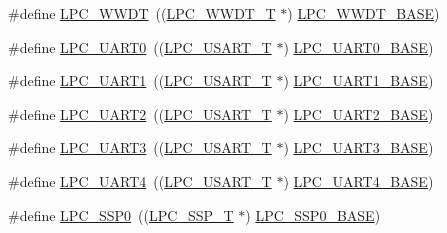 \begin{DoxyCompactItemize}
\item 
\#define \hyperlink{group__PERIPH__407X__8X__BASE_ga235e068b1412366044449dba68194c55}{L\-P\-C\-\_\-\-W\-W\-D\-T}~((\hyperlink{structLPC__WWDT__T}{L\-P\-C\-\_\-\-W\-W\-D\-T\-\_\-\-T}             $\ast$) \hyperlink{group__PERIPH__407X__8X__BASE_ga9b83c39ba53f9c9e87974984c96e35de}{L\-P\-C\-\_\-\-W\-W\-D\-T\-\_\-\-B\-A\-S\-E})
\item 
\#define \hyperlink{group__PERIPH__407X__8X__BASE_ga6ba29f0f9b8af2f72e303533185bcc82}{L\-P\-C\-\_\-\-U\-A\-R\-T0}~((\hyperlink{structLPC__USART__T}{L\-P\-C\-\_\-\-U\-S\-A\-R\-T\-\_\-\-T}            $\ast$) \hyperlink{group__PERIPH__407X__8X__BASE_gaa96fb70405a1298b350fc6f0ad0af997}{L\-P\-C\-\_\-\-U\-A\-R\-T0\-\_\-\-B\-A\-S\-E})
\item 
\#define \hyperlink{group__PERIPH__407X__8X__BASE_ga83ea0dab4dcb7411c2e1de20050a4d2d}{L\-P\-C\-\_\-\-U\-A\-R\-T1}~((\hyperlink{structLPC__USART__T}{L\-P\-C\-\_\-\-U\-S\-A\-R\-T\-\_\-\-T}            $\ast$) \hyperlink{group__PERIPH__407X__8X__BASE_ga18e8f96b25e3f343bdd7ba552ae7a617}{L\-P\-C\-\_\-\-U\-A\-R\-T1\-\_\-\-B\-A\-S\-E})
\item 
\#define \hyperlink{group__PERIPH__407X__8X__BASE_gac8badf231948fc9216d416c71a34e924}{L\-P\-C\-\_\-\-U\-A\-R\-T2}~((\hyperlink{structLPC__USART__T}{L\-P\-C\-\_\-\-U\-S\-A\-R\-T\-\_\-\-T}            $\ast$) \hyperlink{group__PERIPH__407X__8X__BASE_ga8c3873ab74db743465b038c74b365281}{L\-P\-C\-\_\-\-U\-A\-R\-T2\-\_\-\-B\-A\-S\-E})
\item 
\#define \hyperlink{group__PERIPH__407X__8X__BASE_ga61c2bf57d66b50108cdec6878f9e8ee5}{L\-P\-C\-\_\-\-U\-A\-R\-T3}~((\hyperlink{structLPC__USART__T}{L\-P\-C\-\_\-\-U\-S\-A\-R\-T\-\_\-\-T}            $\ast$) \hyperlink{group__PERIPH__407X__8X__BASE_gac8dc517d5e03d4ca7666c18c89d5052e}{L\-P\-C\-\_\-\-U\-A\-R\-T3\-\_\-\-B\-A\-S\-E})
\item 
\#define \hyperlink{group__PERIPH__407X__8X__BASE_gac023ca54f076d863ce21045365ebca63}{L\-P\-C\-\_\-\-U\-A\-R\-T4}~((\hyperlink{structLPC__USART__T}{L\-P\-C\-\_\-\-U\-S\-A\-R\-T\-\_\-\-T}            $\ast$) \hyperlink{group__PERIPH__407X__8X__BASE_ga52bf68ce53e20c93366ba5496e98f5c8}{L\-P\-C\-\_\-\-U\-A\-R\-T4\-\_\-\-B\-A\-S\-E})
\item 
\#define \hyperlink{group__PERIPH__407X__8X__BASE_gac213e0325a8e8a972bd2e0dd6ccf353c}{L\-P\-C\-\_\-\-S\-S\-P0}~((\hyperlink{structLPC__SSP__T}{L\-P\-C\-\_\-\-S\-S\-P\-\_\-\-T}              $\ast$) \hyperlink{group__PERIPH__407X__8X__BASE_ga53fb1af80b541545988f2a966681abfd}{L\-P\-C\-\_\-\-S\-S\-P0\-\_\-\-B\-A\-S\-E})

\end{DoxyCompactItemize}
